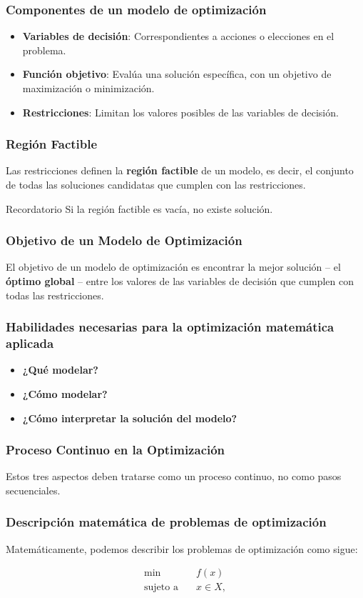 \documentclass{beamer}
\begin{document}
\begin{frame}
\frametitle{Componentes de un modelo de optimización}
\begin{itemize}
    \item \textbf{Variables de decisión}: Correspondientes a acciones o elecciones en el problema.
    \item \textbf{Función objetivo}: Evalúa una solución específica, con un objetivo de maximización o minimización.
    \item \textbf{Restricciones}: Limitan los valores posibles de las variables de decisión.
\end{itemize}
\end{frame}

\begin{frame}
\frametitle{Región Factible}
Las restricciones definen la \textbf{región factible} de un modelo, es decir, el conjunto de todas las soluciones candidatas que cumplen con las restricciones.
\begin{block}{Recordatorio}
Si la región factible es vacía, no existe solución.
\end{block}
\end{frame}

\begin{frame}
\frametitle{Objetivo de un Modelo de Optimización}
El objetivo de un modelo de optimización es encontrar la mejor solución -- el \textbf{óptimo global} -- entre los valores de las variables de decisión que cumplen con todas las restricciones.
\end{frame}

\begin{frame}
\frametitle{Habilidades necesarias para la optimización matemática aplicada}
\begin{itemize}
    \item \textbf{¿Qué modelar?}
    \item \textbf{¿Cómo modelar?}
    \item \textbf{¿Cómo interpretar la solución del modelo?}
\end{itemize}
\end{frame}

\begin{frame}
\frametitle{Proceso Continuo en la Optimización}
Estos tres aspectos deben tratarse como un proceso continuo, no como pasos secuenciales.
\end{frame}

\begin{frame}
\frametitle{Descripción matemática de problemas de optimización}
Matemáticamente, podemos describir los problemas de optimización como sigue:

\begin{align*}
\min \quad &f(x)  \\
\text{sujeto a} \quad & x \in X,
\end{align*}
\end{frame}
\end{document}
